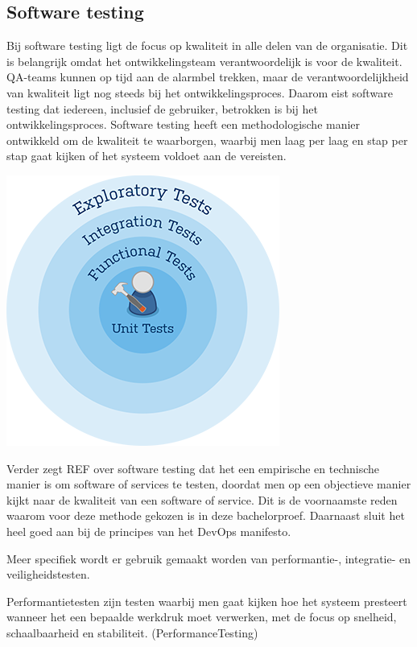 
\subsection{Software testing}
\label{sec:testing-uitleg}
Bij software testing ligt de focus op kwaliteit in alle delen van de organisatie. Dit is belangrijk omdat het ontwikkelingsteam verantwoordelijk is voor de kwaliteit. QA-teams kunnen op tijd aan de alarmbel trekken, maar de verantwoordelijkheid van kwaliteit ligt nog steeds bij het ontwikkelingsproces. Daarom eist software testing dat iedereen, inclusief de gebruiker, betrokken is bij het ontwikkelingsproces. Software testing heeft een methodologische manier ontwikkeld om de kwaliteit te waarborgen, waarbij men laag per laag en stap per stap gaat kijken of het systeem voldoet aan de vereisten.

\begin{center}
	\includegraphics[scale=0.5]{img/testing.png}
\end{center}

Verder zegt REF over software testing dat het een empirische en technische manier is om software of services te testen, doordat men op een objectieve manier kijkt naar de kwaliteit van een software of service. Dit is de voornaamste reden waarom voor deze methode gekozen is in deze bachelorproef. Daarnaast sluit het heel goed aan bij de principes van het DevOps manifesto.

Meer specifiek wordt er gebruik gemaakt worden van performantie-, integratie- en veiligheidstesten.

Performantietesten zijn testen waarbij men gaat kijken hoe het systeem presteert wanneer het een bepaalde werkdruk moet verwerken, met de focus op snelheid, schaalbaarheid en stabiliteit. (PerformanceTesting)

